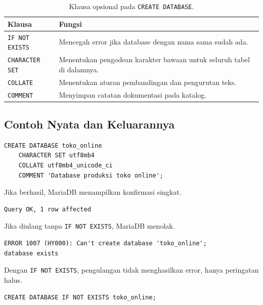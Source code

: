 \documentclass[11pt,a4paper]{article}
\begin{document}
\begin{table}[H]
	\centering
	\caption{Klausa opsional pada \texttt{CREATE DATABASE}.}
	\label{tab:create-clauses}
	\small
	\begin{tabularx}{\textwidth}{l X}
		\toprule
		Klausa                 & Fungsi                                                                \\
		\midrule
		\texttt{IF NOT EXISTS} & Mencegah error jika database dengan nama sama sudah ada.              \\
		\texttt{CHARACTER SET} & Menentukan pengodean karakter bawaan untuk seluruh tabel di dalamnya. \\
		\texttt{COLLATE}       & Menentukan aturan pembandingan dan pengurutan teks.                   \\
		\texttt{COMMENT}       & Menyimpan catatan dokumentasi pada katalog.                           \\
		\bottomrule
	\end{tabularx}
\end{table}

\subsection{Contoh Nyata dan Keluarannya}

\begin{lstlisting}[style=code]
CREATE DATABASE toko_online
    CHARACTER SET utf8mb4
    COLLATE utf8mb4_unicode_ci
    COMMENT 'Database produksi toko online';
\end{lstlisting}

Jika berhasil, MariaDB menampilkan konfirmasi singkat.

\begin{lstlisting}[style=out]
Query OK, 1 row affected
\end{lstlisting}

Jika diulang tanpa \texttt{IF NOT EXISTS}, MariaDB menolak.

\begin{lstlisting}[style=out]
ERROR 1007 (HY000): Can't create database 'toko_online';
database exists
\end{lstlisting}

Dengan \texttt{IF NOT EXISTS}, pengulangan tidak menghasilkan error, hanya peringatan halus.

\begin{lstlisting}[style=code]
CREATE DATABASE IF NOT EXISTS toko_online;
\end{lstlisting}
\end{document}
